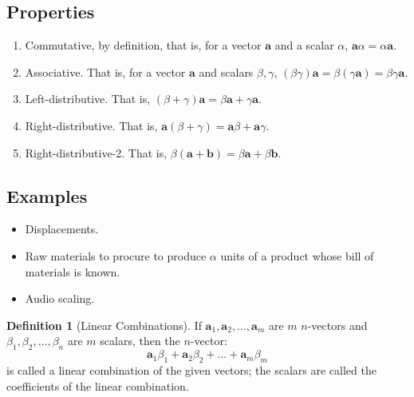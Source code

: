 \documentclass[11pt]{book}
\theoremstyle{definition}
\newtheorem{definition}{Definition}
\theoremstyle{plain}
\theoremstyle{problemstyle}
\theoremstyle{remark}
\theoremstyle{definition}
\begin{document}
\subsection*{Properties}
\label{ss:scalar-vector-multiplication-properties}
\begin{enumerate}
    \item Commutative, by definition, that is, for a vector $\boldsymbol{a}$ and a scalar $\alpha$, $\boldsymbol{a}\alpha=\alpha\boldsymbol{a}$.
    \item Associative. That is, for a vector $\boldsymbol{a}$ and scalars $\beta,\gamma$, $(\beta\gamma)\boldsymbol{a}=\beta(\gamma\boldsymbol{a})=\beta\gamma\boldsymbol{a}$.
    \item Left-distributive. That is, $(\beta+\gamma)\boldsymbol{a}=\beta\boldsymbol{a}+\gamma\boldsymbol{a}$.
    \item Right-distributive. That is, $\boldsymbol{a}(\beta+\gamma)=\boldsymbol{a}\beta+\boldsymbol{a}\gamma$.
    \item Right-distributive-2. That is, $\beta(\boldsymbol{a}+\boldsymbol{b})=\beta\boldsymbol{a}+\beta\boldsymbol{b}$.
\end{enumerate}

\subsection*{Examples}
\begin{itemize}
    \item Displacements.
    \item Raw materials to procure to produce $\alpha$ units of a product whose bill of materials is known.
    \item Audio scaling.
\end{itemize}


\begin{definition}[Linear Combinations]
    \label{def:linear-combination}
    If $\boldsymbol{a}_1,\boldsymbol{a}_2,\dots,\boldsymbol{a}_m$ are $m$ $n$-vectors and $\beta_1,\beta_2,\dots,\beta_n$ are $m$ scalars, then the $n$-vector:
    \[
        \boldsymbol{a}_1\beta_1+\boldsymbol{a}_2\beta_2+\dots+\boldsymbol{a}_m\beta_m
    \]
    is called a linear combination of the given vectors; the scalars are called the coefficients of the linear combination.
\end{definition}
\end{document}

